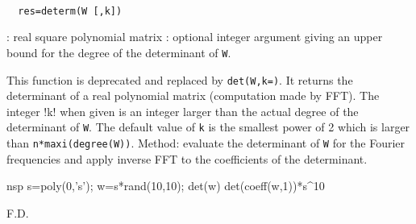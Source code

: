 
\begin{mandesc}
   \\ %
\end{mandesc}
\begin{calling_sequence}
\begin{verbatim}
  res=determ(W [,k])
\end{verbatim}
\end{calling_sequence}
\begin{parameters}
  \begin{varlist}
    : real square polynomial matrix
    : optional integer argument giving an upper bound for the degree of the determinant of \verb!W!.
  \end{varlist}
\end{parameters}
\begin{mandescription}
  This function is deprecated and replaced by \verb!det(W,k=)!. It returns the determinant of a real polynomial matrix 
  (computation made by FFT). The integer !k! when given is an integer larger than the actual degree of the determinant
  of \verb!W!.
  The default value of \verb!k! is the smallest power of 2 which is larger
  than \verb!n*maxi(degree(W))!.
  Method: evaluate the determinant of \verb!W! for the Fourier frequencies
  and apply inverse FFT to the coefficients of the determinant.
\end{mandescription}
\begin{examples}
  \begin{mintednsp}{nsp}
    s=poly(0,'s');
    w=s*rand(10,10);
    det(w)
    det(coeff(w,1))*s^10
  \end{mintednsp}
\end{examples}
\begin{manseealso}
      
\end{manseealso}
\begin{authors}
  F.D.  
\end{authors}
